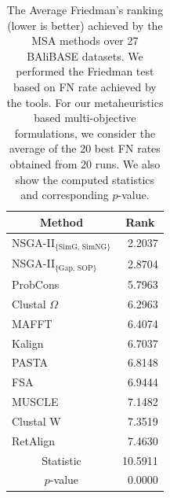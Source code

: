 \begin{table}[htbp]
	\small
	\centering
	\caption{The Average Friedman's ranking (lower is better) achieved by the MSA methods over 27 BAliBASE datasets. We performed the Friedman test based on FN rate achieved by the tools. For our metaheuristics based multi-objective formulations, we consider the average of the 20 best FN rates obtained from 20 runs. We also show the computed statistics and corresponding $ p $-value. }
	\begin{tabular}{|l|r|}
		\hline
		\multicolumn{1}{|c|}{Method} & \multicolumn{1}{c|}{Rank} \\
		\hline
		NSGA-II$_{\text{\{SimG, SimNG\}}}$ & 2.2037 \\
		\hline
		NSGA-II$_{\text{\{Gap, SOP\}}}$ & 2.8704 \\
		\hline
		ProbCons & 5.7963 \\
		\hline
		Clustal $\Omega$ & 6.2963 \\
		\hline
		MAFFT & 6.4074 \\
		\hline
		Kalign & 6.7037 \\
		\hline
		PASTA & 6.8148 \\
		\hline
		FSA   & 6.9444 \\
		\hline
		MUSCLE & 7.1482 \\
		\hline
		Clustal W & 7.3519 \\
		\hline
		RetAlign & 7.4630 \\
		\hline
		\hline
		\multicolumn{1}{|c|}{Statistic} & 10.5911 \\
		\hline
		\multicolumn{1}{|c|}{$ p $-value} & 0.0000 \\
		\hline
	\end{tabular}%
	\label{tab:friedman_rank}%
\end{table}%


